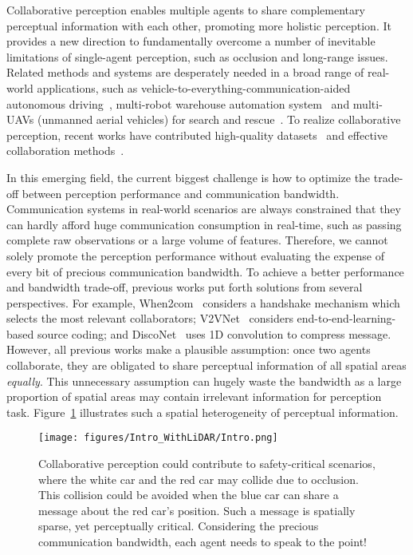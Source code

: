 \documentclass{article}
\begin{document}
Collaborative perception enables multiple agents to share complementary perceptual information with each other, promoting more holistic perception. It provides a new direction to fundamentally overcome a number of inevitable limitations of single-agent perception, such as occlusion and long-range issues. Related methods and systems are desperately needed in a broad range of real-world applications, such as vehicle-to-everything-communication-aided autonomous driving~\cite{v2vnet,disconet,Chen20213DPC},  multi-robot warehouse automation system~\cite{li2020mechanism,zaccaria2021multi} and multi-UAVs (unmanned aerial vehicles) for search and rescue~\cite{scherer2015autonomous,alotaibi2019lsar,DVDET}. To realize collaborative perception, recent works have contributed high-quality datasets~\cite{V2XSim,OPV2V,dair} and effective collaboration methods~\cite{when2com,who2com,disconet,zhou2022multi,ArnoldDT:22,SyncNet,Li2022mrsc, CoBEVT,UQ4CP}.
\vspace{-1mm}

In this emerging field, the current biggest challenge is how to optimize the trade-off between perception performance and communication bandwidth. Communication systems in real-world scenarios are always constrained that they can hardly afford huge communication consumption in real-time, such as passing complete raw observations or a large volume of features. Therefore, we cannot solely promote the perception performance without evaluating the expense of every bit of precious communication bandwidth. To achieve a better performance and bandwidth trade-off, previous works put forth solutions from several perspectives. For example, When2com~\cite{when2com} considers a handshake mechanism which selects the most relevant collaborators; V2VNet~\cite{v2vnet} considers end-to-end-learning-based source coding; and DiscoNet~\cite{disconet} uses 1D convolution to compress message. However, all previous works make a plausible assumption: once two agents collaborate, they are obligated to share perceptual information of all spatial areas \textit{equally}. This unnecessary assumption can hugely waste the bandwidth as a large proportion of spatial areas may contain irrelevant information for perception task. Figure~\ref{fig:CoPerceptionScene} illustrates such a spatial heterogeneity of perceptual information.





\begin{figure}[!t]
    \texttt{[image: figures/Intro\_WithLiDAR/Intro.png]}
\vspace{-7mm}
  \caption{Collaborative perception could contribute to safety-critical scenarios, where the white car and the red car may collide due to occlusion. This collision could be avoided when the blue car can share a message about the red car's position. Such a message is spatially sparse, yet perceptually critical. Considering the precious communication bandwidth, each agent needs to speak to the point!}
  \label{fig:CoPerceptionScene}
  \vspace{-5mm}
\end{figure}
\end{document}
